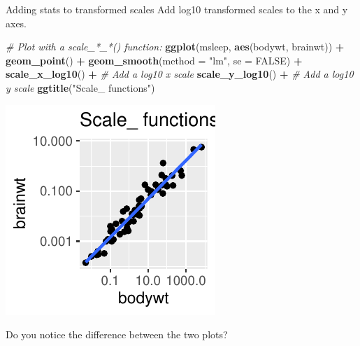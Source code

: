 \documentclass[
  ignorenonframetext,
]{beamer}
\newenvironment{Shaded}{\begin{snugshade}}{\end{snugshade}}
\newcommand{\AttributeTok}[1]{\textcolor[rgb]{0.13,0.29,0.53}{#1}}
\newcommand{\CommentTok}[1]{\textcolor[rgb]{0.56,0.35,0.01}{\textit{#1}}}
\newcommand{\ConstantTok}[1]{\textcolor[rgb]{0.56,0.35,0.01}{#1}}
\newcommand{\FunctionTok}[1]{\textcolor[rgb]{0.13,0.29,0.53}{\textbf{#1}}}
\newcommand{\NormalTok}[1]{#1}
\newcommand{\SpecialCharTok}[1]{\textcolor[rgb]{0.81,0.36,0.00}{\textbf{#1}}}
\newcommand{\StringTok}[1]{\textcolor[rgb]{0.31,0.60,0.02}{#1}}
\begin{document}
\begin{frame}[fragile]{Adding stats to transformed scales}
\label{adding-stats-to-transformed-scales-2}
Add log10 transformed scales to the x and y axes.


\begin{Shaded}
\begin{Highlighting}[]
\CommentTok{\# Plot with a scale\_*\_*() function:}
\FunctionTok{ggplot}\NormalTok{(msleep, }\FunctionTok{aes}\NormalTok{(bodywt, brainwt)) }\SpecialCharTok{+}
  \FunctionTok{geom\_point}\NormalTok{() }\SpecialCharTok{+}
  \FunctionTok{geom\_smooth}\NormalTok{(}\AttributeTok{method =} \StringTok{"lm"}\NormalTok{, }\AttributeTok{se =} \ConstantTok{FALSE}\NormalTok{) }\SpecialCharTok{+}
  \FunctionTok{scale\_x\_log10}\NormalTok{() }\SpecialCharTok{+} \CommentTok{\# Add a log10 x scale}
  \FunctionTok{scale\_y\_log10}\NormalTok{() }\SpecialCharTok{+} \CommentTok{\# Add a log10 y scale}
  \FunctionTok{ggtitle}\NormalTok{(}\StringTok{"Scale\_ functions"}\NormalTok{)}
\end{Highlighting}
\end{Shaded}

\begin{center}\includegraphics[width=0.5\linewidth]{Figs/unnamed-chunk-51-1} \end{center}

Do you notice the difference between the two plots?
\end{frame}
\end{document}
